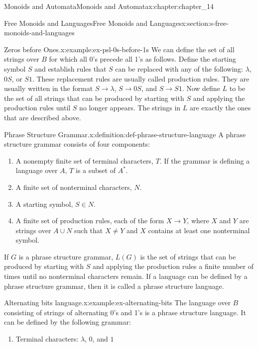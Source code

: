 \documentclass[oneside,10pt,]{book}
\numberwithin{equation}{section}
\begin{document}
\begin{chapterptx}{Monoids and Automata}{}{Monoids and Automata}{}{}{x:chapter:chapter_14}
\begin{sectionptx}{Free Monoids and Languages}{}{Free Monoids and Languages}{}{}{x:section:s-free-monoids-and-languages}
\begin{example}{Zeros before Ones.}{x:example:ex-psl-0s-before-1s}%
We can define the set of all strings over \(B\) for which all 0's precede all 1's as follows. Define the starting symbol \(S\) and establish rules that \(S\) can be replaced with any of the following: \(\lambda\), \(0S\), or \(S1\). These replacement rules are usually called production rules.  They are usually written in the format \(S\to \lambda\), \(S\to 0S\), and \(S\to S1\). Now define \(L\) to be the set of all strings that can be produced by starting with \(S\) and applying the production rules until \(S\) no longer appears. The strings in \(L\) are exactly the ones that are described above.%
\end{example}
\begin{definition}{Phrase Structure Grammar.}{x:definition:def-phrase-structure-language}%
%
\label{g:notation:idm546612963344}%
A phrase structure grammar consists of four components:%
\begin{enumerate}[label=(\arabic*)]
\item{}A nonempty finite set of terminal characters, \(T\). If the grammar is defining a language over \(A\), \(T\) is a subset of \(A^*\).%
\item{}A finite set of nonterminal characters, \(N\).%
\item{}A starting symbol,  \(S\in N\).%
\item{}A finite set of production rules, each of the form \(X\to Y\), where \(X\) and \(Y\) are strings over \(A\cup N\) such that \(X\neq Y\) and \(X\) contains at least one nonterminal symbol.%
\end{enumerate}
%
\par
If \(G\) is a phrase structure grammar, \(L(G)\)  is the set of strings that can be produced by starting with \(S\) and applying the production rules a finite number of times until no nonterminal characters remain. If a language can be defined by a phrase structure grammar, then it is called a phrase structure language.%
\end{definition}
\begin{example}{Alternating bits language.}{x:example:ex-alternating-bits}%
The language over \(B\) consisting of strings of alternating 0's and 1's is a phrase structure language. It can be defined by the following grammar:%
\begin{enumerate}[label=(\arabic*)]
\item{}Terminal characters: \(\lambda\), \(0\), and \(1\)%

\end{enumerate}
\end{example}
\end{sectionptx}
\end{chapterptx}
\end{document}
